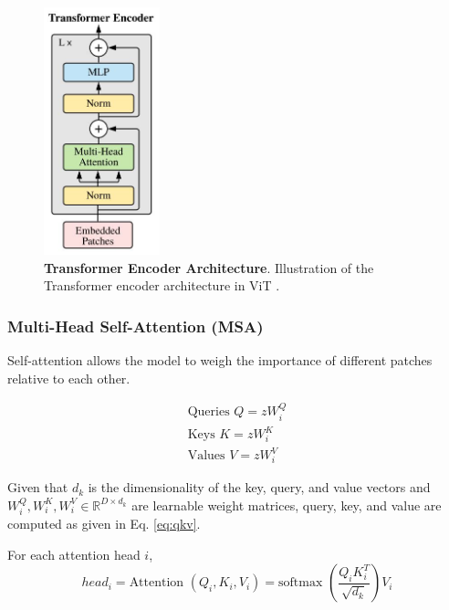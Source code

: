 \begin{figure}
	\centering
	\includegraphics[width=0.3\textwidth]{Images/main/transformerblock.png}
	\caption[\textbf{Transformer Encoder Architecture}]{\textbf{Transformer Encoder Architecture}. Illustration of the Transformer encoder architecture in ViT \cite{dosovitskiy2020image}.}
	\label{fig:transformer_encoder}
\end{figure}

\subsubsection{Multi-Head Self-Attention (MSA)}
Self-attention allows the model to weigh the importance of different patches relative to each other.

\begin{subequations}
	\label{eq:qkv}
	\begin{align}
		\text{Queries  } Q = zW^{Q}_i \label{eq:query} \\
		\text{Keys  } K= zW^{K}_i \label{eq:key} \\
		\text{Values  } V = zW^{V}_i \label{eq:value}
	\end{align}
\end{subequations}

Given that \(d_k\) is the dimensionality of the key, query, and value vectors and \(W^Q_i, W^K_i, W^V_i \in \mathbb{R}^{D \times d_k }\) are learnable weight matrices, query, key, and value are computed as given in Eq. \ref{eq:qkv}.


For each attention head \(i\),
\begin{equation}
	head_i =
	\text{Attention  }(Q_i,K_i,V_i) = \text{softmax  } \left(\frac{Q_iK^{T}_i}{\sqrt{d_k}}\right)V_i
\end{equation}

